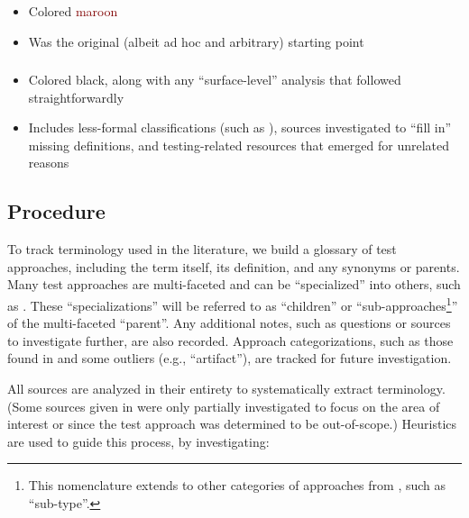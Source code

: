 \subsubsection{}
\label{texts}
\citep{Patton2006, PetersAndPedrycz2000, vanVliet2000}
\begin{itemize}
    \item Colored \textcolor{Maroon}{maroon}
    \item Was the original (albeit ad hoc and arbitrary) starting point
\end{itemize}

\subsubsection{}
\label{others}
\begin{itemize}
    \item Colored black, along with any ``surface-level''
          analysis that followed straightforwardly
    \item Includes less-formal classifications (such as
          \citep{KuļešovsEtAl2013}), sources investigated to ``fill in''
          missing definitions, and
          testing-related resources that emerged for unrelated reasons
\end{itemize}

\subsection{Procedure}

To track terminology used in the literature, we build a glossary of test
approaches, including the term itself, its definition, and
any synonyms or parents. Many test approaches are multi-faceted and can be
``specialized'' into others, such as . These
``specializations'' will be referred to as ``children'' or
``sub-approaches\footnote{This nomenclature extends to other categories of
    approaches from , such as ``sub-type''.}''
of the multi-faceted
``parent''. Any additional notes, such as questions or sources to investigate
further, are also recorded. Approach categorizations, such as those found in
 and some outliers (e.g., ``artifact''), are tracked
for future investigation.

All sources are analyzed in their entirety to systematically extract
terminology. (Some sources given in 
were only partially investigated to focus on the area of interest or since
the test approach was determined to be out-of-scope.)
Heuristics are used to guide this process, by investigating:

